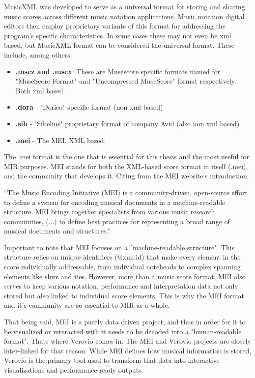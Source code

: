 MusicXML was developed to serve as a universal format for storing and sharing music scores across different music notation applications. Music notation digital editors then employ proprietary variants of this format for addressing the program's specific characteristics. In some cases these may not even be xml based, but MusicXML format can be considered the universal format.
These include, among others:
\begin{itemize}
    \item \textbf{.mscz and .mscx}: These are Musescore specific formats named for "MuseScore Format" and  "Uncompressed MuseScore" format respectively. Both xml based.
    \item \textbf{.dora} - "Dorico" specific format (non xml based)
    \item \textbf{.sib}  - "Sibelius" proprietary format  of company Avid (also non xml based)
    \item \textbf{.mei}  - The \ac{MEI}. \ac{XML} based.
\end{itemize}

The .mei format is the one that is essential for this thesis and the most useful for \ac{MIR} purposes. \ac{MEI} stands for both the \ac{XML}-based score format in itself (.mei), and the community that develops it. Citing from the \ac{MEI} website's introduction:

``The Music Encoding Initiative (\ac{MEI}) is a community-driven, open-source effort to define a system for encoding musical documents in a machine-readable structure. \ac{MEI} brings together specialists from various music research communities, (...) to define best practices for representing a broad range of musical documents and structures.''\cite{MEI-Website}

Important to note that \ac{MEI} focuses on a "machine-readable structure". This structure relies on unique identifiers (@xml:id) that make every element in the score individually addressable, from individual noteheads to complex spanning elements like slurs and ties. However, more than a music score format, \ac{MEI} also serves to keep various notation, performance and interpretation data not only stored but also linked to individual score elements. This is why the \ac{MEI} format and it's community are so essential to \ac{MIR} as a whole. 

That being said, \ac{MEI} is a purely data driven project, and thus in order for it to be visualized or interacted with it needs to be decoded into a "human-readable format". Thats where Verovio comes in. The \ac{MEI} and Verovio projects are closely inter-linked for that reason. While \ac{MEI} defines how musical information is stored, Verovio is the primary tool used to transform that data into interactive visualizations and performance-ready outputs. 

